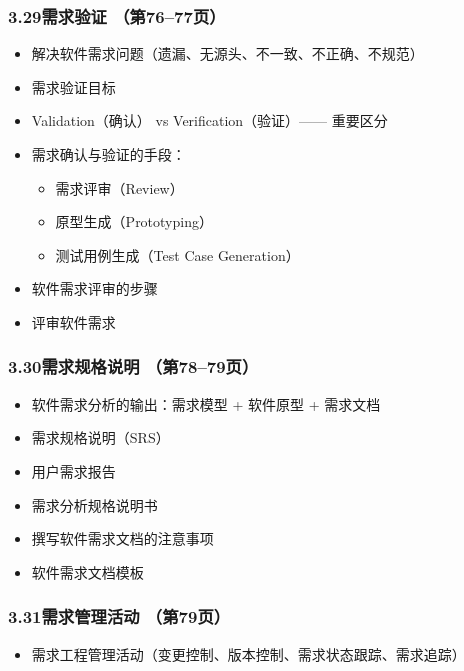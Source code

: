 \documentclass[12pt,a4paper]{ctexart}
\begin{document}
\subsubsection{3.29\quad 需求验证 \hfill（第76--77页）}
\begin{itemize}
    \item 解决软件需求问题（遗漏、无源头、不一致、不正确、不规范）
    \item 需求验证目标
    \item Validation（确认） vs Verification（验证）—— 重要区分
    \item 需求确认与验证的手段：
    \begin{itemize}
        \item 需求评审（Review）
        \item 原型生成（Prototyping）
        \item 测试用例生成（Test Case Generation）
    \end{itemize}
    \item 软件需求评审的步骤
    \item 评审软件需求
\end{itemize}

\subsubsection{3.30\quad 需求规格说明 \hfill（第78--79页）}
\begin{itemize}
    \item 软件需求分析的输出：需求模型 + 软件原型 + 需求文档
    \item 需求规格说明（SRS）
    \item 用户需求报告
    \item 需求分析规格说明书
    \item 撰写软件需求文档的注意事项
    \item 软件需求文档模板
\end{itemize}

\subsubsection{3.31\quad 需求管理活动 \hfill（第79页）}
\begin{itemize}
    \item 需求工程管理活动（变更控制、版本控制、需求状态跟踪、需求追踪）
\end{itemize}

\vspace{0.3cm}
\end{document}
